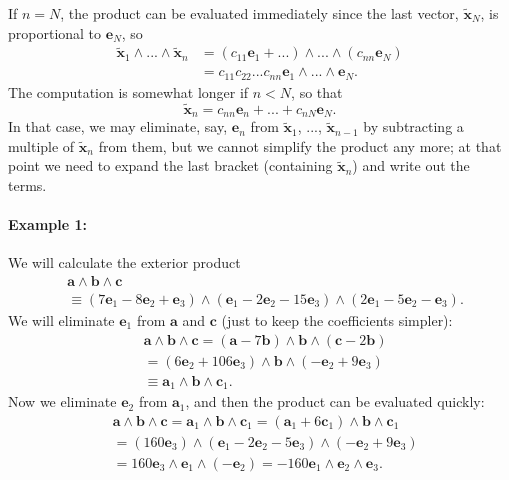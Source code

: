 If $n=N$, the product can be evaluated immediately since the last
vector, $\tilde{\mathbf{x}}_{N}$, is proportional to $\mathbf{e}_{N}$,
so\begin{align*}
\tilde{\mathbf{x}}_{1}\wedge...\wedge\tilde{\mathbf{x}}_{n} & =\left(c_{11}\mathbf{e}_{1}+...\right)\wedge...\wedge(c_{nn}\mathbf{e}_{N})\\
 & =c_{11}c_{22}...c_{nn}\mathbf{e}_{1}\wedge...\wedge\mathbf{e}_{N}.\end{align*}
 The computation is somewhat longer if $n<N$, so that \[
\tilde{\mathbf{x}}_{n}=c_{nn}\mathbf{e}_{n}+...+c_{nN}\mathbf{e}_{N}.\]
In that case, we may eliminate, say, $\mathbf{e}_{n}$ from $\tilde{\mathbf{x}}_{1}$,
..., $\tilde{\mathbf{x}}_{n-1}$ by subtracting a multiple of $\tilde{\mathbf{x}}_{n}$
from them, but we cannot simplify the product any more; at that point
we need to expand the last bracket (containing $\tilde{\mathbf{x}}_{n}$)
and write out the terms.


\paragraph{Example 1: }

We will calculate the exterior product\begin{align*}
 & \mathbf{a}\wedge\mathbf{b}\wedge\mathbf{c}\\
 & \equiv(7\mathbf{e}_{1}-8\mathbf{e}_{2}+\mathbf{e}_{3})\wedge(\mathbf{e}_{1}-2\mathbf{e}_{2}-15\mathbf{e}_{3})\wedge(2\mathbf{e}_{1}-5\mathbf{e}_{2}-\mathbf{e}_{3}).\end{align*}
We will eliminate $\mathbf{e}_{1}$ from $\mathbf{a}$ and $\mathbf{c}$
(just to keep the coefficients simpler):\begin{align*}
 & \mathbf{a}\wedge\mathbf{b}\wedge\mathbf{c}=(\mathbf{a}-7\mathbf{b})\wedge\mathbf{b}\wedge(\mathbf{c}-2\mathbf{b})\\
 & =(6\mathbf{e}_{2}+106\mathbf{e}_{3})\wedge\mathbf{b}\wedge(-\mathbf{e}_{2}+9\mathbf{e}_{3})\\
 & \equiv\mathbf{a}_{1}\wedge\mathbf{b}\wedge\mathbf{c}_{1}.\end{align*}
Now we eliminate $\mathbf{e}_{2}$ from $\mathbf{a}_{1}$, and then
the product can be evaluated quickly:\begin{align*}
 & \mathbf{a}\wedge\mathbf{b}\wedge\mathbf{c}=\mathbf{a}_{1}\wedge\mathbf{b}\wedge\mathbf{c}_{1}=(\mathbf{a}_{1}+6\mathbf{c}_{1})\wedge\mathbf{b}\wedge\mathbf{c}_{1}\\
 & =(160\mathbf{e}_{3})\wedge(\mathbf{e}_{1}-2\mathbf{e}_{2}-5\mathbf{e}_{3})\wedge(-\mathbf{e}_{2}+9\mathbf{e}_{3})\\
 & =160\mathbf{e}_{3}\wedge\mathbf{e}_{1}\wedge(-\mathbf{e}_{2})=-160\mathbf{e}_{1}\wedge\mathbf{e}_{2}\wedge\mathbf{e}_{3}.\end{align*}



